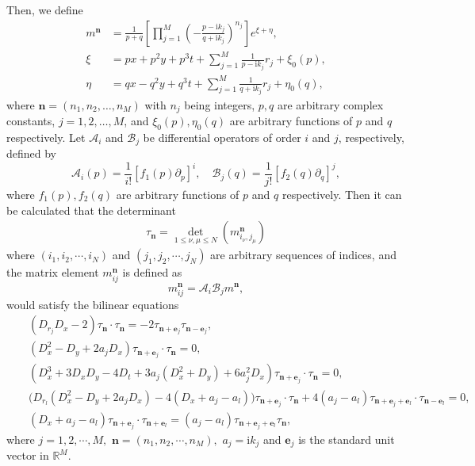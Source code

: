 \documentclass[preprint,3p,10pt]{elsarticle}
\theoremstyle{definition}
\begin{document}
Then, we define 
\begin{equation*}
  \begin{aligned}
m^{\mathbf{n}} &=\frac{1}{p+q}\left[\prod_{j=1}^{M}\left(-\frac{p-\mathrm{i} k_j}{q+\mathrm{i} k_j}\right)^{n_j}  \right] e^{\xi+\eta}, \\
\xi &=p x+p^2 y+p^3 t+\sum_{j=1}^M\frac{1}{p-\mathrm{i} k_j} r_j +\xi_0(p), \\
\eta &=q x-q^2 y+q^3 t+\sum_{j=1}^M\frac{1}{q+\mathrm{i} k_j} r_j +\eta_0(q),
\end{aligned}
\end{equation*}
where $\mathbf{n}=\left(n_1, n_2, \ldots, n_M\right)$ with $n_j$ being integers, $p, q$   are arbitrary complex constants,  $j=1,2,\dots, M$,  and $ \xi_0(p), \eta_0(q)$ are arbitrary functions of $p$ and $q$ respectively.
Let $\mathcal{A}_i$ and $\mathcal{B}_j$ be differential operators of order $i$ and $j$, respectively, defined by
\begin{equation}
\mathcal{A}_i(p)=\frac{1}{i !}\left[f_1(p) \partial_p\right]^i, \quad \mathcal{B}_j(q)=\frac{1}{j !}\left[f_2(q) \partial_q\right]^j,
\end{equation}
where $ f_1(p), f_2(q) $ are arbitrary functions of $p$ and $q$ respectively.
Then it can be calculated that \cite{ohta2012general} the determinant
\begin{eqnarray}
\tau_{\mathbf{n}} = \det_{1 \leq  \nu, \mu  \leq N}\left( m_{i_\nu, j_\mu}^{\mathbf{n}}  \right)
\end{eqnarray}
where $\left(i_1, i_2, \cdots, i_N\right)$ and $\left(j_1, j_2, \cdots, j_N\right)$ are arbitrary sequences of indices, and the matrix element $m_{i j}^{\mathbf{n}}$ is defined as
\begin{equation} \label{phi equation}
m_{i j}^{\mathbf{n}}=\mathcal{A}_i \mathcal{B}_j m^{\mathbf{n}},
\end{equation}
would satisfy the bilinear equations \cite{shi2026soliton2}
\begin{eqnarray}
&&\left( D_{r_j} D_x - 2 \right) \tau_{\mathbf{n}} \cdot \tau_{\mathbf{n}}
= -2 \tau_{\mathbf{n}+\mathbf{e}_j} \tau_{\mathbf{n}-\mathbf{e}_j},\label{eqn: KP1}
\\
&&\left( D_x^2 - D_y + 2 a_j D_x \right) \tau_{\mathbf{n}+\mathbf{e}_j} \cdot \tau_{\mathbf{n}}
= 0,\label{eqn: KP2}
\\
&&\left( D_x^3 + 3 D_x D_y - 4 D_t
+ 3 a_j \left( D_x^2 + D_y \right)
+ 6 a_j^2 D_x \right) \tau_{\mathbf{n}+\mathbf{e}_j} \cdot \tau_{\mathbf{n}}
= 0,\label{eqn: KP3}
\\
&&\Big(
D_{r_l} \left( D_x^2 - D_y + 2 a_j D_x \right)
- 4 ( D_x + a_j - a_l )
\Big) \tau_{\mathbf{n}+\mathbf{e}_j} \cdot \tau_{\mathbf{n}}
+ 4 ( a_j - a_l ) \tau_{\mathbf{n}+\mathbf{e}_j+\mathbf{e}_l} \cdot \tau_{\mathbf{n}-\mathbf{e}_l}
= 0,\label{eqn: KP4}
\\
&&\left( D_x + a_j - a_l \right) \tau_{\mathbf{n}+\mathbf{e}_j} \cdot \tau_{\mathbf{n}+\mathbf{e}_l}
= ( a_j - a_l ) \tau_{\mathbf{n}+\mathbf{e}_j+\mathbf{e}_l} \tau_{\mathbf{n}},\label{eqn: KP5}
\end{eqnarray}
where $j=1,2,\cdots,M,$ $\mathbf{n}=(n_1,n_2,\cdots,n_M),$ $a_j = \mathrm{i} k_j$ and $\mathbf{e}_j$ is the standard unit vector in $\mathbb{R}^M$.
\end{document}
